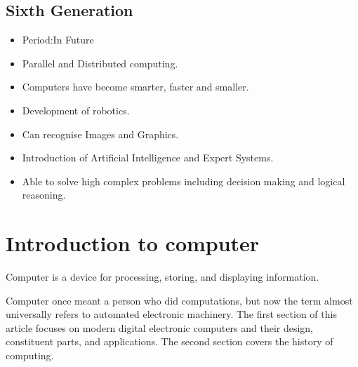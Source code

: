 \documentclass[11pt,a4paper,twoside]{article}
\begin{document}
\subsection{Sixth Generation}
\begin{itemize}
    \item Period:In Future
    \item Parallel and Distributed computing.
    \item Computers have become smarter, faster and smaller.
    \item Development of robotics.
    \item Can recognise Images and Graphics.
    \item Introduction of Artificial Intelligence and Expert Systems.
    \item Able to solve high complex problems including decision making and logical reasoning.  
\end{itemize}
\section{Introduction to computer}
Computer is a device for processing, storing, and displaying information.\par
Computer once meant a person who did computations, but now the term almost universally refers to automated electronic machinery. The first section of this article focuses on modern digital electronic computers and their design, constituent parts, and applications. The second section covers the history of computing.
\end{document}
